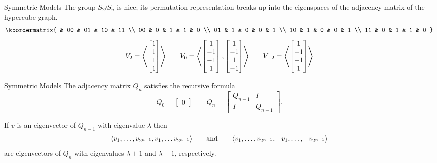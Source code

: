 \documentclass[xcolor=dvipsnames]{beamer}
\begin{document}
\begin{frame}{Symmetric Models}
    The group $S_2 \wr S_n$ is nice; its permutation representation breaks up into
    the eigenspaces of the adjacency matrix of the hypercube graph.
    \[
        \kbordermatrix{
            & 00 & 01 & 10 & 11 \\
        00  &  0 & 1  & 1  & 0 \\
        01  &  1 & 0  & 0  & 1 \\
        10  &  1 & 0  & 0  & 1 \\
        11  &  0 & 1  & 1  & 0
        }
    \]\[
        V_2 = \adel*{\begin{bmatrix} 1 \\ 1 \\ 1 \\ 1\end{bmatrix}}
        \qquad
        V_0 = \adel*{
            \begin{bmatrix} 1 \\ -1 \\ -1 \\ 1\end{bmatrix},
            \begin{bmatrix} 1 \\ -1 \\  1 \\ -1\end{bmatrix}
            }
        \qquad
        V_{-2} = \adel*{\begin{bmatrix} 1 \\ -1 \\ -1 \\ 1\end{bmatrix}}
    \]
\end{frame}

\begin{frame}{Symmetric Models}
    The adjacency matrix $Q_n$ satisfies the recursive formula
    \[
        Q_0 = \begin{bmatrix} 0 \end{bmatrix}
        \qquad
        Q_n = \begin{bmatrix} Q_{n-1} & I \\ I & Q_{n-1} \end{bmatrix}.
    \]

    \lspace
    If $v$ is an eigenvector of $Q_{n-1}$ with eigenvalue $\lambda$ then
    \[
        \langle v_1, \ldots, v_{2^{n-1}},v_1, \ldots v_{2^{n-1}}\rangle
        \qquad\text{and}\qquad
    \langle v_1, \ldots, v_{2^{n-1}}, -v_1, \ldots, -v_{2^{n-1}}\rangle
    \]
    are eigenvectors of $Q_n$ with eigenvalues $\lambda +1$
    and $\lambda - 1$, respectively.
\end{frame}
\end{document}
